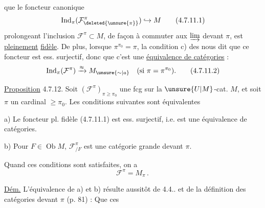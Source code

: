 que le foncteur canonique
\[
\operatorname{Ind}_{\pi}(\mathcal F^\pi_{\deleted{\unsure{\pi}}})\hookrightarrow M
\tag*{(4.7.11.1)}
\]
prolongeant l'inclusion $\mathcal F^\pi\subset M$, de façon
à commuter aux $\varinjlim$  devant $\pi$, est
\uline{pleinement} \uline{fidèle}. De plus, lorsque
$\pi^{\pi_0}=\pi$, la condition c) des  nous dit
 que ce foncteur est ess. surjectif, donc
que c'est une \uline{équivalence de catégories} :
\[
\operatorname{Ind}_{\pi}(\mathcal F^\pi)\xrightarrow{\approx}M_{\unsure{\sim|a}}\quad
(\text{si }\pi=\pi^{\pi_0}).
\tag*{(4.7.11.2)}
\]

\uline{Proposition} 4.7.12. Soit $(\mathcal F^\pi)_{\pi\geq\pi_0}$ une fcg
 sur la $\unsure{U|M}$-cat. $M$, et soit $\pi$ un cardinal $\geq\pi_0$.
Les conditions suivantes sont équivalentes

a) Le foncteur pl. fidèle (4.7.11.1) est
ess. surjectif, i.e. est une équivalence de
catégories.

b) Pour  $F\in\operatorname{Ob}M$, $\mathcal F^\pi_{/F}$ est
une catégorie  grande devant $\pi$.

 Quand ces conditions sont satisfaites,  on a
\[
\mathcal F^\pi=M_\pi\mathpunct{.}
\tag*{(4.7.12.1)}
\]

\uline{Dém.} L'équivalence de a) et b) résulte
aussitôt de 4.4.. et de la définition
des catégories  devant $\pi$ (p. 81) : Que ces
